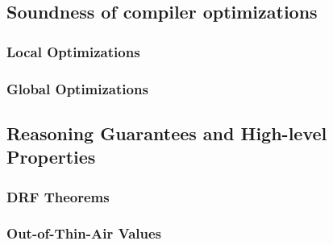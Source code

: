 






\subsection{Soundness of compiler optimizations}

\subsubsection{Local Optimizations}

\subsubsection{Global Optimizations}

\subsection{Reasoning Guarantees and High-level Properties}

\subsubsection{DRF Theorems}

\subsubsection{Out-of-Thin-Air Values}

